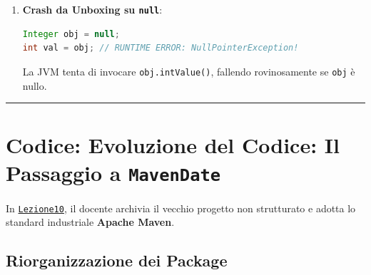 \documentclass[11pt,a4paper,oneside]{report}
\newcommand{\passthrough}[1]{#1}
\begin{document}
\begin{itemize}
\begin{enumerate}
\begin{lstlisting}[language=Java]
Integer a = 100, b = 100;
System.out.println(a == b); // TRUE! (La JVM ricicla lo stesso oggetto cacheato)

Integer c = 200, d = 200;
System.out.println(c == d); // FALSE! (Fuori range [-128, 127], alloca 2 oggetti distinti nello Heap!)
\end{lstlisting}

    Conclusione: \textbf{Mai usare \passthrough{\lstinline!==!} per
    confrontare i wrapper}, usare sempre
    \passthrough{\lstinline!.equals()!}!
  \item
    \textbf{Crash da Unboxing su \passthrough{\lstinline!null!}}:

\begin{lstlisting}[language=Java]
Integer obj = null;
int val = obj; // RUNTIME ERROR: NullPointerException!
\end{lstlisting}

    La JVM tenta di invocare \passthrough{\lstinline!obj.intValue()!},
    fallendo rovinosamente se \passthrough{\lstinline!obj!} è nullo.
  \end{enumerate}
\end{itemize}

\begin{center}\rule{0.5\linewidth}{0.5pt}\end{center}

\section{\texorpdfstring{Codice: Evoluzione del Codice: Il Passaggio a
\texttt{MavenDate}}{Codice: Evoluzione del Codice: Il Passaggio a MavenDate}}\label{chap09_codice-evoluzione-del-codice-il-passaggio-a-mavendate}

In
\href{file:///home/wally/Documenti/GitHub/Programmazione-II/25-26/Teoria-e-Esercitazioni/Codice-20260902/Lezione10}{\passthrough{\lstinline!Lezione10!}},
il docente archivia il vecchio progetto non strutturato e adotta lo
standard industriale \textbf{Apache Maven}.

\subsection{Riorganizzazione dei
Package}\label{chap09_riorganizzazione-dei-package}
\end{document}
